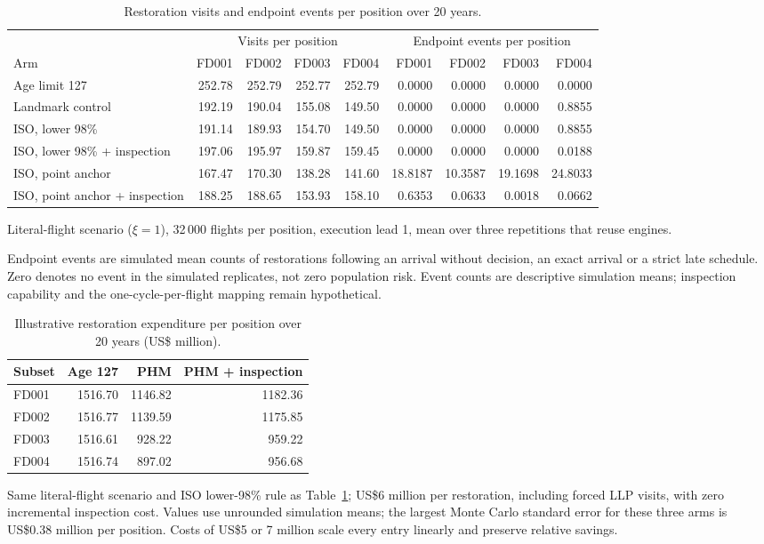 \documentclass[12pt]{article}
\newcommand{\tablenotes}[1]{\par\smallskip\begin{minipage}{\linewidth}\footnotesize\raggedright\setlength{\parindent}{0pt}#1\end{minipage}}
\begin{document}
\begin{table}[htbp]
\centering
\caption{Restoration visits and endpoint events per position over 20 years.}
\label{tab:twenty}
\footnotesize
\setlength{\tabcolsep}{3pt}
\begin{tabularx}{\linewidth}{@{}Xrrrrrrrr@{}}
\toprule
 & \multicolumn{4}{c}{Visits per position} & \multicolumn{4}{c}{Endpoint events per position} \\
\cmidrule(lr){2-5}\cmidrule(lr){6-9}
Arm & FD001 & FD002 & FD003 & FD004 & FD001 & FD002 & FD003 & FD004 \\
\midrule
Age limit 127 & 252.78 & 252.79 & 252.77 & 252.79 & 0.0000 & 0.0000 & 0.0000 & 0.0000 \\
Landmark control & 192.19 & 190.04 & 155.08 & 149.50 & 0.0000 & 0.0000 & 0.0000 & 0.8855 \\
ISO, lower 98\% & 191.14 & 189.93 & 154.70 & 149.50 & 0.0000 & 0.0000 & 0.0000 & 0.8855 \\
ISO, lower 98\% + inspection & 197.06 & 195.97 & 159.87 & 159.45 & 0.0000 & 0.0000 & 0.0000 & 0.0188 \\
ISO, point anchor & 167.47 & 170.30 & 138.28 & 141.60 & 18.8187 & 10.3587 & 19.1698 & 24.8033 \\
ISO, point anchor + inspection & 188.25 & 188.65 & 153.93 & 158.10 & 0.6353 & 0.0633 & 0.0018 & 0.0662 \\
\bottomrule
\end{tabularx}
\tablenotes{Literal-flight scenario ($\xi=1$), 32\,000 flights per position, execution lead 1, mean over three repetitions that reuse engines.

Endpoint events are simulated mean counts of restorations following an arrival without decision, an exact arrival or a strict late schedule. Zero denotes no event in the simulated replicates, not zero population risk. Event counts are descriptive simulation means; inspection capability and the one-cycle-per-flight mapping remain hypothetical.}
\end{table}

\begin{table}[htbp]
\centering
\caption{Illustrative restoration expenditure per position over 20 years (US\$ million).}
\label{tab:restoration-cost}
\begin{tabular}{@{}lrrr@{}}
\toprule
Subset & Age 127 & PHM & PHM + inspection \\
\midrule
FD001 & 1516.70 & 1146.82 & 1182.36 \\
FD002 & 1516.77 & 1139.59 & 1175.85 \\
FD003 & 1516.61 & 928.22 & 959.22 \\
FD004 & 1516.74 & 897.02 & 956.68 \\
\bottomrule
\end{tabular}
\tablenotes{Same literal-flight scenario and ISO lower-98\% rule as Table~\ref{tab:twenty}; US\$6 million per restoration, including forced LLP visits, with zero incremental inspection cost. Values use unrounded simulation means; the largest Monte Carlo standard error for these three arms is US\$0.38 million per position. Costs of US\$5 or 7 million scale every entry linearly and preserve relative savings.}
\end{table}
\end{document}
